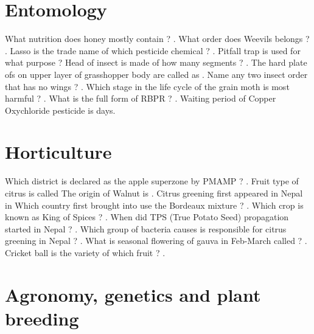 \documentclass[10pt,a4paper,answers]{exam}
\begin{document}
\section*{Entomology}

\begin{questions}
  \question What nutrition does honey mostly contain ? \fillin[Carbohydrate][3cm].
  \question What order does Weevils belongs ? \fillin[Coleoptera][3cm].  
  \question Lasso is the trade name of which pesticide chemical ? \fillin[Alachlor][3cm].
  \question Pitfall trap is used for what purpose ? 
  \question Head of insect is made of how many segments ? \fillin[4][3cm].
  \question The hard plate ofs on upper layer of grasshopper body are called as \fillin[Sclerites][3cm].
  \question Name any two insect order that has no wings ? .
  \question Which stage in the life cycle of the grain moth is most harmful ? \fillin[Caterpillar][3cm].
  \question What is the full form of RBPR ? .
  \question Waiting period of Copper Oxychloride pesticide is \fillin[21][3cm] days.
\end{questions}

\section*{Horticulture}

\begin{questions}
  \question Which district is declared as the apple superzone by PMAMP ? \fillin[Jumla][3cm]. 
  \question Fruit type of citrus is called \fillin[Hesperidium][3cm]
  \question The origin of Walnut is \fillin[Iran][3cm].
  \question Citrus greening first appeared in Nepal in \fillin[2022 BS][3cm]
  \question Which country first brought into use the Bordeaux mixture ? \fillin[France][3cm].
  \question Which crop is known as King of Spices ? .
  \question When did TPS (True Potato Seed) propagation started in Nepal ? \fillin[2042 BS][3cm].
  \question Which group of bacteria causes is responsible for citrus greening in Nepal ? .
  \question What is seasonal flowering of gauva in Feb-March called ? .
  \question Cricket ball is the variety of which fruit ? \fillin[Sapota][3cm].
\end{questions}

\section*{Agronomy, genetics and plant breeding}
\end{document}
